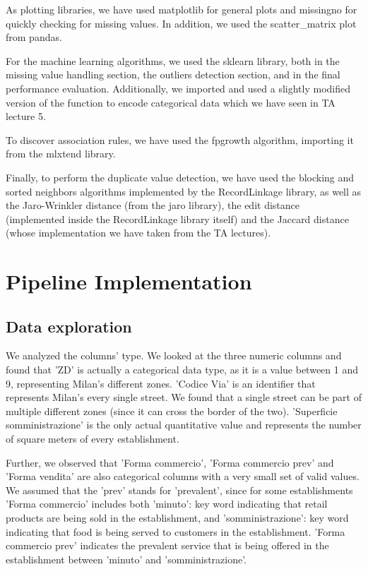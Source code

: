 \documentclass{article}
\begin{document}
As plotting libraries, we have used matplotlib for general plots and missingno 
for quickly checking for missing values. In addition, we used the scatter\_matrix plot from pandas.

For the machine learning algorithms, we used the sklearn library, both in the missing value handling section, the outliers detection section, and in the final performance evaluation. Additionally, we imported and used a slightly modified version of the function to encode categorical data which we have seen in TA lecture 5.

To discover association rules, we have used the fpgrowth algorithm, importing it from the mlxtend library.

Finally, to perform the duplicate value detection, we have used the blocking and sorted neighbors algorithms implemented by the RecordLinkage library, as well as the Jaro-Wrinkler distance (from the jaro library), the edit distance (implemented inside the RecordLinkage library itself) and the Jaccard distance (whose implementation we have taken from the TA lectures).

\section{Pipeline Implementation}

\subsection{Data exploration}
We analyzed the columns' type. We looked at the three numeric columns and found that 'ZD' is actually a categorical data type, as it is a value between 1 and 9, representing Milan's different zones. 'Codice Via' is an identifier that represents Milan's every single street. We found that a single street can be part of multiple different zones (since it can cross the border of the two). 'Superficie somministrazione' is the only actual quantitative value and represents the number of square meters of every establishment. 

Further, we observed that 'Forma commercio', 'Forma commercio prev' and 'Forma vendita' are also categorical columns with a very small set of valid values. We assumed that the 'prev' stands for 'prevalent', since for some establishments 'Forma commercio' includes both 'minuto': key word indicating that retail products are being sold in the establishment, and 'somministrazione': key word indicating that food is being served to customers in the establishment. 'Forma commercio prev' indicates the prevalent service that is being offered in the establishment between 'minuto' and 'somministrazione'.
\end{document}
